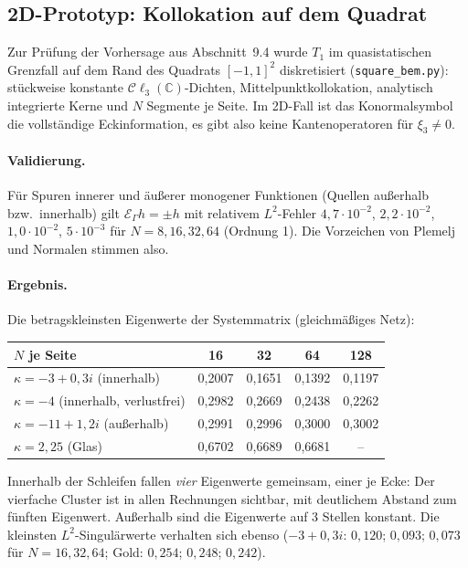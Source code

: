 \documentclass[11pt, a4paper]{article}
\newcommand{\clc}{\mathcal{C}\ell_{3}(\mathbb{C})}
\newcommand{\EG}{\mathcal{E}_\Gamma}
\theoremstyle{plain}
\theoremstyle{definition}
\begin{document}
\subsection{2D-Prototyp: Kollokation auf dem Quadrat}\label{sec:quadrat}

Zur Prüfung der Vorhersage aus Abschnitt~9.4 wurde $T_1$ im quasistatischen
Grenzfall auf dem Rand des Quadrats $[-1,1]^2$ diskretisiert
(\texttt{square\_bem.py}): stückweise konstante $\clc$-Dichten,
Mittelpunktkollokation, analytisch integrierte Kerne und $N$ Segmente je Seite.
Im 2D-Fall ist das Konormalsymbol die vollständige Eckinformation, es gibt also
keine Kantenoperatoren für $\xi_3\neq0$.

\paragraph{Validierung.} Für Spuren innerer und äußerer monogener Funktionen
(Quellen außerhalb bzw.\ innerhalb) gilt $\EG h = \pm h$ mit relativem
$L^2$-Fehler $4{,}7\cdot10^{-2}$, $2{,}2\cdot10^{-2}$, $1{,}0\cdot10^{-2}$,
$5\cdot10^{-3}$ für $N=8,16,32,64$ (Ordnung 1). Die Vorzeichen von Plemelj und
Normalen stimmen also.

\paragraph{Ergebnis.} Die betragskleinsten Eigenwerte der Systemmatrix
(gleichmäßiges Netz):
\begin{center}\small
\begin{tabular}{lcccc}
\toprule
$N$ je Seite & 16 & 32 & 64 & 128\\
\midrule
$\kappa=-3+0{,}3i$ (innerhalb) & 0,2007 & 0,1651 & 0,1392 & 0,1197\\
$\kappa=-4$ (innerhalb, verlustfrei) & 0,2982 & 0,2669 & 0,2438 & 0,2262\\
$\kappa=-11+1{,}2i$ (außerhalb) & 0,2991 & 0,2996 & 0,3000 & 0,3002\\
$\kappa=2{,}25$ (Glas) & 0,6702 & 0,6689 & 0,6681 & --\\
\bottomrule
\end{tabular}
\end{center}
Innerhalb der Schleifen fallen \emph{vier} Eigenwerte gemeinsam, einer je Ecke:
Der vierfache Cluster ist in allen Rechnungen sichtbar, mit deutlichem Abstand zum
fünften Eigenwert. Außerhalb sind die Eigenwerte auf 3 Stellen konstant. Die
kleinsten $L^2$-Singulärwerte verhalten sich ebenso ($-3+0{,}3i$: $0{,}120$;
$0{,}093$; $0{,}073$ für $N=16,32,64$; Gold: $0{,}254$; $0{,}248$; $0{,}242$).
\end{document}
